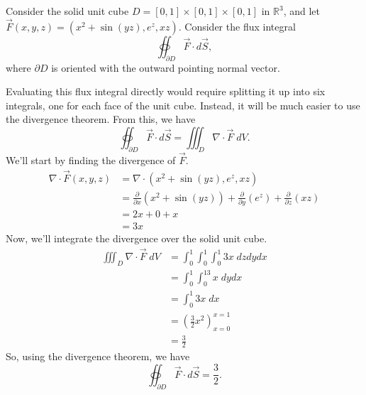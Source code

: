 \documentclass{ximera}
\begin{document}
\begin{example}
Consider the solid unit cube $D = [0,1]\times [0,1]\times [0,1]$ in $\mathbb{R}^3$,  and let $\vec{F}(x,y,z) = \left(x^2 + \sin(yz), e^{z}, xz\right)$. Consider the flux integral
\[
\oiint_{\partial D} \vec{F}\cdot d\vec{S},
\]
where $\partial D$ is oriented with the outward pointing normal vector.

Evaluating this flux integral directly would require splitting it up into six integrals, one for each face of the unit cube. Instead, it will be much easier to use the divergence theorem. From this, we have
\[
\oiint_{\partial D} \vec{F}\cdot d\vec{S} = \iiint_D \nabla\cdot \vec{F}\;dV.
\]
We'll start by finding the divergence of $\vec{F}$.
\begin{align*}
\nabla\cdot \vec{F}(x,y,z) &= \nabla\cdot \left(x^2 + \sin(yz), e^{z}, xz\right)\\
&=\frac{\partial}{\partial x}(x^2 + \sin(yz)) + \frac{\partial}{\partial y}(e^{z}) + \frac{\partial}{\partial z}(xz)\\
&= 2x+0+x\\
&= 3x
\end{align*}
Now, we'll integrate the divergence over the solid unit cube.
\begin{align*}
 \iiint_D \nabla\cdot \vec{F}\;dV &= \int_0^1\int_0^1\int_0^1 3x\;dzdydx\\
 &= \int_0^1\int_0^13x\;dydx\\
 &= \int_0^1 3x\;dx\\
 &= \left(\frac{3}{2}x^2\right)_{x=0}^{x=1}\\
 &= \frac{3}{2}
\end{align*}
So, using the divergence theorem, we have
\[
\oiint_{\partial D} \vec{F}\cdot d\vec{S} = \frac{3}{2}.
\]
\end{example}
\end{document}
